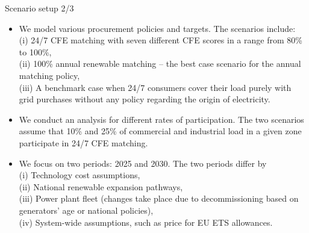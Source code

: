 \begin{frame}{Scenario setup 2/3}

  {\small 
  \begin{itemize}

  \item We model various procurement policies and targets. The scenarios include: \\
  (i) \alert{24/7 CFE matching} with seven different CFE scores in a range from 80\% to 100\%, \\
  (ii) \alert{100\% annual renewable matching} -- the best case scenario for the annual matching policy, \\
  (iii) \alert{A benchmark case} when 24/7 consumers cover their load purely with grid purchases 
  without any policy regarding the origin of electricity.

  \item We conduct an analysis for different rates of participation. The two scenarios 
  assume that \alert{10\%} and \alert{25\%} of commercial and industrial load
  in a given zone participate in 24/7 CFE matching.

  \item We focus on two periods: \alert{2025} and \alert{2030}. The two periods differ by \\ 
  (i) Technology cost assumptions, \\
  (ii) National renewable expansion pathways,\\
  (iii) Power plant fleet (changes take place due to decommissioning based on generators' 
  age or national policies), \\
  (iv) System-wide assumptions, such as price for EU ETS allowances.

  \end{itemize}
  }
\end{frame}



